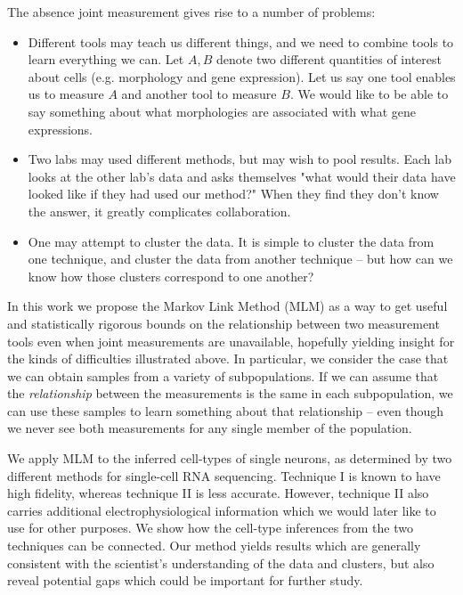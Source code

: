 The absence joint measurement gives rise to a number of problems:

\begin{itemize}

\item Different tools may teach us different things, and we need to combine tools
to learn everything we can.  Let $A,B$ denote two different quantities of interest about cells (e.g. morphology and gene expression).   Let us say one tool enables us to measure $A$ and another tool to measure $B$.  We would like
to be able to say something about what morphologies are associated with what gene expressions.  

\item Two labs may used different methods, but may wish to pool results.  Each lab looks at the other
lab's data and asks themselves "what would their data have looked like if they had used our method?"  When
they find they don't know the answer, it greatly complicates collaboration.

\item One may attempt to cluster the data.  It is simple to cluster the data from one technique, and cluster the data
from another technique -- but how can we know how those clusters correspond to one another?  

\end{itemize}

In this work we propose the Markov Link Method (MLM) as a way to get useful and statistically rigorous bounds on the relationship between two measurement tools even when joint measurements are unavailable, hopefully yielding insight for the kinds of difficulties illustrated above.   In particular, we consider the case that we can obtain samples from a variety of subpopulations.  If we can assume that the \emph{relationship} between the measurements is the same in each subpopulation, we can use these samples to learn something about that relationship -- even though we never see both measurements for any single member of the population.  

We apply MLM to the inferred cell-types of single neurons, as determined by two different methods for single-cell RNA sequencing.  Technique I is known to have high fidelity, whereas technique II is less accurate.  However, technique II also carries additional electrophysiological information which we would later like to use for other purposes.  We show how the cell-type inferences from the two techniques can be connected.  Our method yields results which are generally consistent with the scientist's understanding of the data and clusters, but also reveal potential gaps which could be important for further study.

